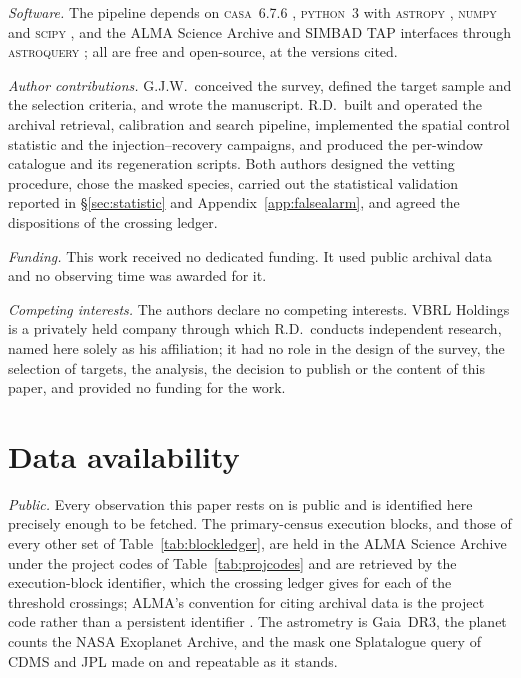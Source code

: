 \emph{Software.} The pipeline depends on \textsc{casa}~6.7.6
\citep{CASA2022}, \textsc{python}~3 with \textsc{astropy} \citep{Astropy2022}, \textsc{numpy}
\citep{Harris2020} and \textsc{scipy} \citep{Virtanen2020}, and the ALMA Science
Archive and SIMBAD TAP interfaces through \textsc{astroquery} \citep{Ginsburg2019};
all are free and open-source, at the versions cited.

\emph{Author contributions.} G.J.W.\ conceived the survey, defined the target sample and the selection
criteria, and wrote the manuscript. R.D.\ built and operated the archival
retrieval, calibration and search pipeline, implemented the spatial control
statistic and the injection--recovery campaigns, and produced the per-window
catalogue and its regeneration scripts. Both authors designed the vetting
procedure, chose the masked species, carried out the statistical
validation reported in \S\ref{sec:statistic} and
Appendix~\ref{app:falsealarm}, and agreed the dispositions of
the crossing ledger.

\emph{Funding.} This work received no dedicated funding. It used public archival data and
no observing time was awarded for it.

\emph{Competing interests.} The authors declare no competing interests. VBRL Holdings is a privately
held company through which R.D.\ conducts independent research, named
here solely as his affiliation; it had no role in the design of the
survey, the selection of targets, the analysis, the decision to publish
or the content of this paper, and provided no funding for the work.

\section*{Data availability}
\label{sec:data}
\emph{Public.} Every observation this paper rests on is public and is
identified here precisely enough to be fetched. The \NEB{} primary-census
execution blocks, and those of every other set of
Table~\ref{tab:blockledger}, are held in the ALMA Science Archive under the
\NProjCodes{} project codes of Table~\ref{tab:projcodes} and are retrieved by
the execution-block identifier, which the crossing ledger gives for each of
the \EvNCrossRaw{} threshold crossings; ALMA's convention for citing archival
data is the project code rather than a persistent identifier \citep{Chen2022}.
The astrometry is Gaia~DR3, the planet counts the NASA Exoplanet Archive, and
the mask one Splatalogue query of CDMS and JPL made on \McQueryDate{} and
repeatable as it stands.

